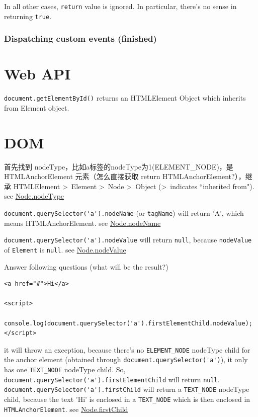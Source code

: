 \documentclass[a4paper, 12pt]{article}
\begin{document}
In all other cases, \verb|return| value is ignored. In particular, there's no sense in returning \verb|true|.

\subsubsection{Dispatching custom events (finished)}



\section{Web API}
\verb|document.getElementById()| returns an HTMLElement Object which inherits from Element object.


\section{DOM}
首先找到 nodeType，比如a标签的nodeType为1(ELEMENT\_NODE)，是 HTMLAnchorElement 元素（怎么直接获取 return HTMLAnchorElement?），继承 HTMLElement \textgreater\ Element \textgreater\ Node \textgreater\ Object (\textgreater\ indicates ``inherited from").\\ see \href{https://developer.mozilla.org/en-US/docs/Web/API/Node/nodeType}{Node.nodeType}

{\color{red}\verb|document.querySelector('a').nodeName| (or \verb|tagName|)} will return 'A', which means HTMLAnchorElement. see \href{https://developer.mozilla.org/en-US/docs/Web/API/Node/nodeName}{Node.nodeName}

\verb|document.querySelector('a').nodeValue| will return \verb|null|, because \verb|nodeValue| of \verb|Element| is \verb|null|. see \href{https://developer.mozilla.org/en-US/docs/Web/API/Node/nodeValue}{Node.nodeValue}

Answer following questions (what will be the result?)
\begin{verbatim}
<a href="#">Hi</a>

<script>
  console.log(document.querySelector('a').firstElementChild.nodeValue);
</script>
\end{verbatim}

it will throw an exception, because there's no \verb|ELEMENT_NODE| nodeType child for the anchor element (obtained through \verb|document.querySelector('a')|), it only has one \verb|TEXT_NODE| nodeType child. So, \verb|document.querySelector('a').firstElementChild| will return \verb|null|. \verb|document.querySelector('a').firstChild| will return a \verb|TEXT_NODE| nodeType child, because the text 'Hi' is enclosed in a \verb|TEXT_NODE| which is then enclosed in \verb|HTMLAnchorElement|. see \href{https://developer.mozilla.org/en-US/docs/Web/API/Node/firstChild}{Node.firstChild}
\end{document}
